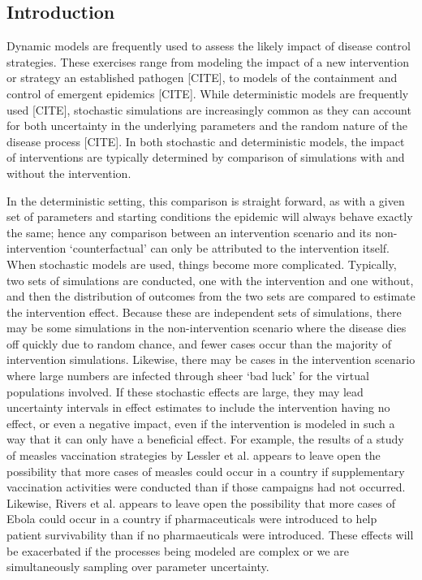 \documentclass[PTRSB]{rsos}
\begin{document}
\begin{multicols}{2}
\section{Introduction}
Dynamic models are frequently used to assess the likely impact of disease control strategies.
These exercises range from modeling the impact of a new intervention or strategy an established pathogen [CITE], to models of the containment and control of emergent epidemics [CITE].
While deterministic models are frequently used [CITE], stochastic simulations are increasingly common as they can account for both uncertainty in the underlying parameters and the random nature of the disease process [CITE].
In both stochastic and deterministic models, the impact of interventions are typically determined by comparison of simulations with and without the intervention.

In the deterministic setting, this comparison is straight forward, as with a given set of parameters and starting conditions the epidemic will always behave exactly the same; hence any comparison between an intervention scenario and its non-intervention ‘counterfactual’ can only be attributed to the intervention itself.
When stochastic models are used, things become more complicated.
Typically, two sets of simulations are conducted, one with the intervention and one without, and then the distribution of outcomes from the two sets are compared to estimate the intervention effect.
Because these are independent sets of simulations, there may be some simulations in the non-intervention scenario where the disease dies off quickly due to random chance, and fewer cases occur than the majority of intervention simulations.
Likewise, there may be cases in the intervention scenario where large numbers are infected through sheer ‘bad luck’ for the virtual populations involved.
If these stochastic effects are large, they may lead uncertainty intervals in effect estimates to include the intervention having no effect, or even a negative impact, even if the intervention is modeled in such a way that it can only have a beneficial effect.
For example, the results of a study of measles vaccination strategies by Lessler et al. appears to leave open the possibility that more cases of measles could occur in a country if supplementary vaccination activities were conducted than if those campaigns had not occurred.
Likewise, Rivers et al. appears to leave open the possibility that more cases of Ebola could occur in a country if pharmaceuticals were introduced to help patient survivability than if no pharmaeuticals were introduced.
These effects will be exacerbated if the processes being modeled are complex or we are simultaneously sampling over parameter uncertainty.


\end{multicols}
\end{document}
